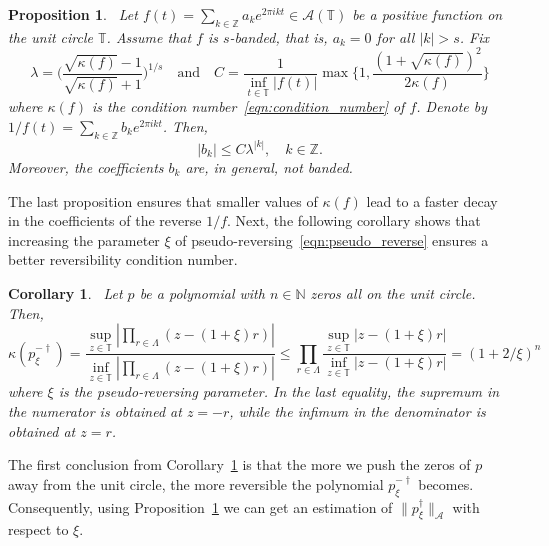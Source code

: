 \documentclass[12pt]{article}
\newtheorem{prop}[theorem]{Proposition}
\newtheorem{coro}[theorem]{Corollary}
\begin{document}
\begin{prop}~\label{prop:decay_of_reverse}
    Let $f(t)=\sum_{k\in\mathbb{Z}}a_ke^{2\pi ikt}\in\mathcal{A}(\mathbb{T})$ be a positive function on the unit circle $\mathbb{T}$. Assume that $f$ is $s$-banded, that is, $a_k=0$ for all $|k|>s$. Fix 
    \begin{equation*}
        \lambda=\bigg(\frac{\sqrt{\kappa(f)}-1}{\sqrt{\kappa(f)}+1}\bigg)^{1/s} \quad \text{and} \quad C=\frac{1}{\inf_{t\in\mathbb{T}}|f(t)|}\max\bigg\{1, \frac{(1+\sqrt{\kappa(f)})^2}{2\kappa(f)}\bigg\}
    \end{equation*}
    where $\kappa(f)$ is the condition number~\eqref{eqn:condition_number} of $f$. Denote by $1/f(t)=\sum_{k\in\mathbb{Z}}b_ke^{2\pi ikt}$. Then,
    \begin{equation*}
        |b_k|\leq C\lambda^{|k|}, \quad k\in\mathbb{Z}.
    \end{equation*}
    Moreover, the coefficients $b_k$ are, in general, not banded.
\end{prop}

The last proposition ensures that smaller values of $\kappa(f)$ lead to a faster decay in the coefficients of the reverse $1/f$. Next, the following corollary shows that increasing the parameter $\xi$ of pseudo-reversing~\eqref{eqn:pseudo_reverse} ensures a better reversibility condition number.

\begin{coro}~\label{coro:kappa_of_pseudo}
    Let $p$ be a polynomial with $n\in\mathbb{N}$ zeros all on the unit circle. Then,
    \begin{equation*}
        \kappa(p_\xi^{-\dagger}) = \frac{\sup_{z\in\mathbb{T}}|\prod_{r\in\Lambda}(z-(1 + \xi) r)|}{\inf_{z\in\mathbb{T}}|\prod_{r\in\Lambda}(z-(1 + \xi) r)|}\leq \prod_{r\in\Lambda}\frac{\sup_{z\in\mathbb{T}}|z-(1 + \xi) r|}{\inf_{z\in\mathbb{T}}|z-(1 + \xi) r|} = (1+2/\xi)^n
    \end{equation*}
    where $\xi$ is the pseudo-reversing parameter. In the last equality, the supremum in the numerator is obtained at $z=-r$, while the infimum in the denominator is obtained at $z=r$.
\end{coro}

The first conclusion from  Corollary~\ref{coro:kappa_of_pseudo} is that the more we push the zeros of $p$ away from the unit circle, the more reversible the polynomial $p_\xi^{-\dagger}$ becomes. Consequently, using Proposition~\ref{prop:decay_of_reverse} we can get an estimation of $\|p^\dagger_\xi\|_\mathcal{A}$ with respect to $\xi$.
\end{document}
